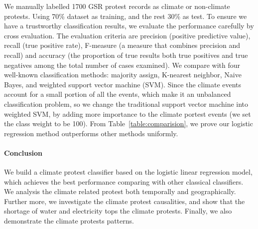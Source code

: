 \documentclass[9pt,twocolumn,twoside]{pnas-new}
\begin{document}
We manually labelled 1700 GSR protest records as climate or non-climate protests. Using 70\% dataset as training, and the rest 30\% as test. To ensure we have a trustworthy classification results, we evaluate the performance carefully by cross evaluation. The evaluation criteria are precision (positive predictive value), recall (true positive rate), F-measure (a measure that combines precision and recall) and accuracy (the proportion of true results both true positives and true negatives among the total number of cases examined). We compare with four well-known classification methods: majority assign, K-nearest neighbor, Naive Bayes, and weighted support vector machine (SVM). Since the climate events account for a small portion of all the events, which make it an unbalanced classification problem, so we change the traditional support vector machine into weighted SVM, by adding more importance to the climate portest events (we set the class weight to be 100). From Table~\ref{table:comparision}, we prove our logistic regression method outperforms other methods uniformly.

\paragraph{Conclusion} We build a climate protest classifier based on the logistic linear regression model, which achieves the best performance comparing with other classical classifiers. We analysis the climate related protest both temporally and geographically. Further more, we investigate the climate protest causalities, and show that the shortage of water and electricity tops the climate protests. Finally, we also demonstrate the climate protests patterns.


\showmatmethods %



\showacknow %

\pnasbreak


\end{document}
